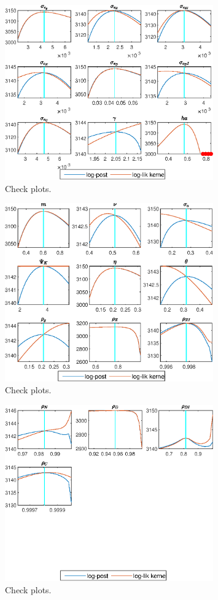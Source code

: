  
\begin{figure}[H]
\centering 
\includegraphics[width=0.80\textwidth]{BRS_growth_util/graphs/BRS_growth_util_CheckPlots1}
\caption{Check plots.}\label{Fig:CheckPlots:1}
\end{figure}
 
\begin{figure}[H]
\centering 
\includegraphics[width=0.80\textwidth]{BRS_growth_util/graphs/BRS_growth_util_CheckPlots2}
\caption{Check plots.}\label{Fig:CheckPlots:2}
\end{figure}
 
\begin{figure}[H]
\centering 
\includegraphics[width=0.80\textwidth]{BRS_growth_util/graphs/BRS_growth_util_CheckPlots3}
\caption{Check plots.}\label{Fig:CheckPlots:3}
\end{figure}
 
